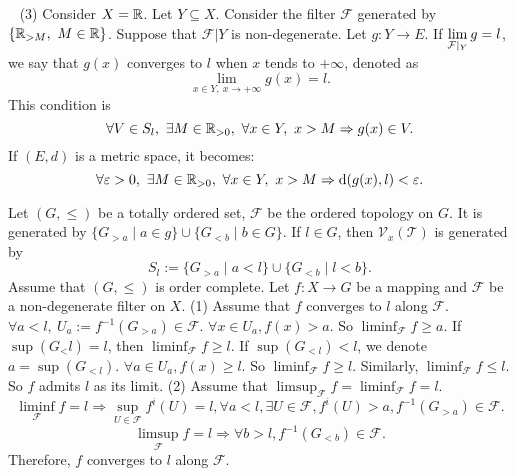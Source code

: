 \begin{exampleenv}
    \ \newline
    (3) Consider $X=\mathbb{R}$. Let $Y\subseteq X$. Consider the filter $\mathcal{F}$ generated by $\{\mathbb{R}_{>M},\ M\in \mathbb{R}\}$. Suppose that $\mathcal{F}|Y$ is non-degenerate. Let $g:Y\longrightarrow E$. If $\displaystyle \lim_{\mathcal{F}|_Y}g=l$, we say that $g(x)$ converges to $l$ when $x$ tends to $+\infty$, denoted as $$\lim_{x\in Y,\ x\rightarrow+\infty}g(x)=l.$$
     This condition is
    $$\forall V\in S_l,\ \exists M\in \RR_{>0},\ \forall x\in Y,\ x>M\Rightarrow g(x)\in V.$$
    If $(E,d)$ is a metric space, it becomes:
    $$\forall \varepsilon >0,\ \exists M\in \RR_{>0},\ \forall x\in Y,\ x>M\Rightarrow \mathrm{d}(g(x),l)<\varepsilon.$$
\end{exampleenv}
\begin{exampleenv}
    Let $(G,\le)$ be a totally ordered set, $\mathcal{F}$ be the ordered topology on $G$. It is generated by $\{G_{>a}\mid a\in g\}\cup\{G_{<b}\mid b\in G\}$. If $l\in G$, then $\mathcal{V}_x(\mathscr{T})$ is generated by 
    $$S_l:=\{G_{>a}\mid a<l\}\cup\{G_{<b}\mid l<b\}.$$
    Assume that $(G,\le)$ is order complete. Let $f:X\longrightarrow G$ be a mapping and $\mathcal{F}$  be  a non-degenerate filter on $X$.
    \newline
    (1) Assume that $f$ converges to $l$ along $\mathcal{F}$. $\forall a< l, \ U_a:=f^{-1}\left(G_{>a}\right)\in \mathcal{F}$. $\forall x\in U_a, f(x)>a$. So $\liminf_{\mathcal{F}}f\ge a$. If $\sup\left(G_<l\right)=l$, then $\liminf_{\mathcal{F}}f\ge l.$ If $\sup\left(G_{<l}\right)<l$, we denote $a=\sup\left(G_{<l}\right)$. $\forall a\in U_a, f(x)\ge l$. So $\liminf_{\mathcal{F}}f\ge l$. Similarly, $\liminf_{\mathcal{F}}f\le l$. So $f$ admits $l$ as its limit.
    \newline
    (2) Assume that $\limsup_{\mathcal{F}}f=\liminf_{\mathcal{F}}f=l$. 
    $$\liminf_{\mathcal{F}}f=l\Rightarrow \sup_{U\in \mathcal{F}}f^i(U)=l, \forall a<l, \exists U\in \mathcal{F}, f^i(U)>a, f^{-1}(G_{>a})\in \mathcal{F}.$$
    $$\limsup_{\mathcal{F}}f=l\Rightarrow \forall b>l, f^{-1}(G_{<b})\in \mathcal{F}.$$
    Therefore, $f$ converges to $l$ along $\mathcal{F}$.
\end{exampleenv}

